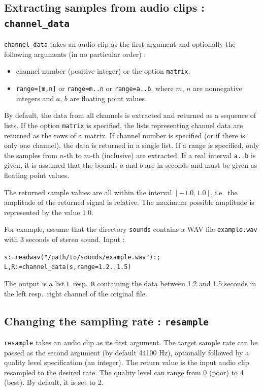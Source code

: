 \documentclass[a4paper,11pt]{book}
\begin{document}
\subsection{Extracting samples from audio clips : {\tt channel\_data}}
{\tt channel\_data} takes an audio clip as the first argument and optionally the following arguments (in no particular order) :
\begin{itemize}
  \item channel number (positive integer) or the option {\tt matrix},
  \item {\tt range=[m,n]} or {\tt range=m..n} or {\tt range=a..b}, where $m$, $n$ are nonnegative integers and $a$, $b$ are floating point values.
\end{itemize}
By default, the data from all channels is extracted and returned as a sequence of lists. If the option {\tt matrix} is specified, the lists representing channel data are returned as the rows of a matrix. If channel number is specified (or if there is only one channel), the data is returned in a single list. If a range is specified, only the samples from $n$-th to $m$-th (inclusive) are extracted. If a real interval {\tt a..b} is given, it is assumed that the bounds $a$ and $b$ are in seconds and must be given as floating point values.

The returned sample values are all within the interval $[-1.0,1.0]$, i.e.~the amplitude of the returned signal is relative. The maximum possible amplitude is represented by the value $1.0$.

For example, assume that the directory {\tt sounds} contains a WAV file {\tt example.wav} with 3 seconds of stereo sound. Input :
\begin{center}
  {\tt s:=readwav("/path/to/sounds/example.wav"):;\\L,R:=channel\_data(s,range=1.2..1.5)}
\end{center}
The output is a list {\tt L} resp.~{\tt R} containing the data between 1.2 and 1.5 seconds in the left resp.~right channel of the original file.

\subsection{Changing the sampling rate : {\tt resample}}
{\tt resample} takes an audio clip as its first argument. The target sample rate can be passed as the second argument (by default 44100 Hz), optionally followed by a quality level specification (an integer). The return value is the input audio clip resampled to the desired rate. The quality level can range from 0 (poor) to 4 (best). By default, it is set to 2.
\end{document}
